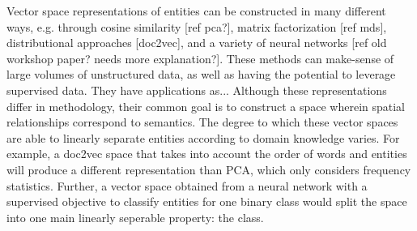 Vector space representations of entities can be constructed in many different ways, e.g. through cosine similarity [ref pca?], matrix factorization [ref mds], distributional approaches [doc2vec], and a variety of neural networks [ref old workshop paper? needs more explanation?]. These methods can make-sense of large volumes of unstructured data, %
as well as having the potential to leverage supervised data. %
They have applications as... %
Although these representations differ in methodology, their common goal is to construct a space wherein spatial relationships correspond to semantics. The degree to which these vector spaces are able to linearly separate entities according to domain knowledge varies. %
For example, a doc2vec space that takes into account the order of words and entities will produce a different representation than PCA, which only considers frequency statistics. Further, a vector space obtained from a neural network with a supervised objective to classify entities for one binary class would split the space into one main linearly seperable property: the class.